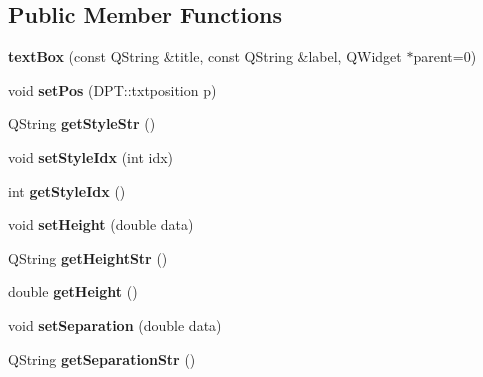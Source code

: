 \subsection*{Public Member Functions}
\begin{DoxyCompactItemize}
\item 
\hypertarget{classtextBox_a4bca3e431c8506a1532a2f862068058e}{{\bfseries text\-Box} (const Q\-String \&title, const Q\-String \&label, Q\-Widget $\ast$parent=0)}\label{classtextBox_a4bca3e431c8506a1532a2f862068058e}

\item 
\hypertarget{classtextBox_ad910f4b0bdeef0e5c6acf395983cf9c5}{void {\bfseries set\-Pos} (D\-P\-T\-::txtposition p)}\label{classtextBox_ad910f4b0bdeef0e5c6acf395983cf9c5}

\item 
\hypertarget{classtextBox_a1a7b485993a07aaf91ce8a329ac2afe3}{Q\-String {\bfseries get\-Style\-Str} ()}\label{classtextBox_a1a7b485993a07aaf91ce8a329ac2afe3}

\item 
\hypertarget{classtextBox_a8b737f5a36a1616896f7cbda9a410185}{void {\bfseries set\-Style\-Idx} (int idx)}\label{classtextBox_a8b737f5a36a1616896f7cbda9a410185}

\item 
\hypertarget{classtextBox_ac0de8e28e18c5892335c2c1156bf65be}{int {\bfseries get\-Style\-Idx} ()}\label{classtextBox_ac0de8e28e18c5892335c2c1156bf65be}

\item 
\hypertarget{classtextBox_a48a3e7bd325774b2b4c4065d1d457ba2}{void {\bfseries set\-Height} (double data)}\label{classtextBox_a48a3e7bd325774b2b4c4065d1d457ba2}

\item 
\hypertarget{classtextBox_a13e7011cea87c269cc853c5a1a63292f}{Q\-String {\bfseries get\-Height\-Str} ()}\label{classtextBox_a13e7011cea87c269cc853c5a1a63292f}

\item 
\hypertarget{classtextBox_a3d45933ba4cbf91a99bcc49d87c8f3ee}{double {\bfseries get\-Height} ()}\label{classtextBox_a3d45933ba4cbf91a99bcc49d87c8f3ee}

\item 
\hypertarget{classtextBox_aafd44ed9fa47bc617df846cc21b0f544}{void {\bfseries set\-Separation} (double data)}\label{classtextBox_aafd44ed9fa47bc617df846cc21b0f544}

\item 
\hypertarget{classtextBox_ac5ce3c3378ad68b8bc58eaecadbbb4de}{Q\-String {\bfseries get\-Separation\-Str} ()}\label{classtextBox_ac5ce3c3378ad68b8bc58eaecadbbb4de}


\end{DoxyCompactItemize}
